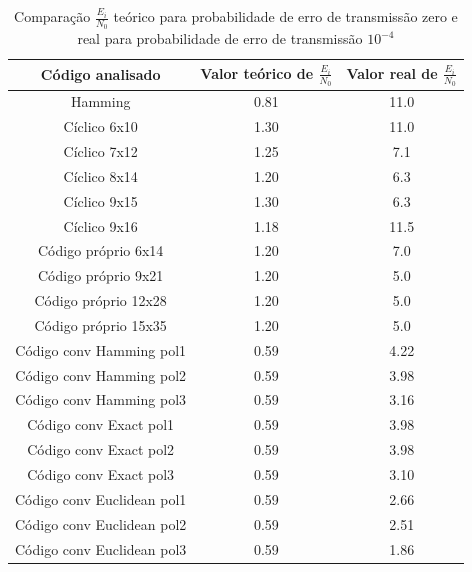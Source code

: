 \begin{table}[h!]
\centering
\caption {Comparação $\frac{E_i}{N_0}$ teórico para probabilidade de erro de transmissão zero e real para probabilidade de erro de transmissão $10^{-4}$} \label{tab:teorico} 
\begin{tabular}{|c|c|c|}
	\hline 
Código analisado	&  Valor teórico de $\frac{E_i}{N_0}$  & Valor real de $\frac{E_i}{N_0}$\\
	\hline 
	Hamming	&  0.81 & 11.0\\ 
	\hline 
	Cíclico 6x10	&  1.30 & 11.0\\ 
	\hline 
	Cíclico 7x12	&  1.25 & 7.1\\ 
	\hline 
	Cíclico 8x14	&  1.20 & 6.3\\ 
	\hline 
	Cíclico 9x15	&  1.30 & 6.3\\ 
	\hline 
	Cíclico 9x16	&  1.18 & 11.5\\ 
	\hline 
	Código próprio 6x14	&  1.20 & 7.0\\ 
	\hline 
	Código próprio 9x21	&  1.20 & 5.0\\ 
	\hline 
	Código próprio 12x28	&  1.20 & 5.0\\ 
	\hline 
	Código próprio 15x35	&  1.20 & 5.0\\ 
	\hline 
	Código conv Hamming pol1	&  0.59 & 4.22\\ 
	\hline 
	Código conv Hamming pol2	&  0.59 & 3.98\\ 
	\hline 
	Código conv Hamming pol3	&  0.59 & 3.16\\ 
	\hline
	Código conv Exact pol1	&  0.59 & 3.98\\ 
	\hline 
	Código conv Exact pol2	&  0.59 & 3.98\\ 
	\hline 
	Código conv Exact pol3	&  0.59 & 3.10\\ 
	\hline
	Código conv Euclidean pol1	&  0.59 & 2.66\\ 
	\hline 
	Código conv Euclidean pol2	&  0.59 & 2.51\\ 
	\hline 
	Código conv Euclidean pol3	&  0.59 & 1.86\\ 
	\hline
	
\end{tabular} 

\end{table}
\newpage